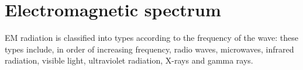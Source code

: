          \section{Electromagnetic spectrum}
    \nopagebreak
            \nopagebreak
EM radiation is classified into types according to the frequency of the wave: these types include, in order of increasing frequency, radio waves, microwaves, infrared radiation, visible light, ultraviolet radiation, X-rays and gamma rays.\par 
            \nopagebreak
      
